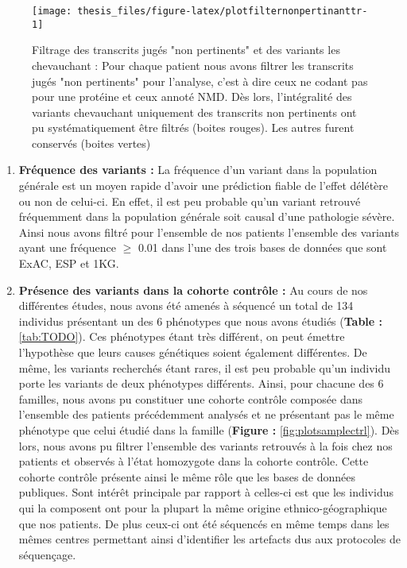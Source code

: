 \documentclass[12pt,twoside]{reedthesis}
\theoremstyle{definition}
\theoremstyle{definition}
\theoremstyle{remark}
\begin{document}
  \begin{figure}
  
  {\centering \texttt{[image: thesis\_files/figure-latex/plotfilternonpertinanttr-1]} 
  
  }
  
  \caption[Filtrage des transcrits jugés "non pertinents" et des variants les chevauchant]{Filtrage des transcrits jugés "non pertinents" et des variants les chevauchant : Pour chaque patient nous avons filtrer les transcrits jugés "non pertinents" pour l'analyse, c'est à dire ceux ne codant pas pour une protéine et ceux annoté NMD. Dès lors, l'intégralité des variants chevauchant uniquement des transcrits non pertinents ont pu systématiquement être filtrés (boites rouges). Les autres furent conservés (boites vertes)}\label{fig:plotfilternonpertinanttr}
  \end{figure}
  
  \begin{enumerate}
  \def\labelenumi{\arabic{enumi}.}
  \setcounter{enumi}{4}
  \item
    \textbf{Fréquence des variants :} La fréquence d'un variant dans la
    population générale est un moyen rapide d'avoir une prédiction fiable
    de l'effet délétère ou non de celui-ci. En effet, il est peu probable
    qu'un variant retrouvé fréquemment dans la population générale soit
    causal d'une pathologie sévère. Ainsi nous avons filtré pour
    l'ensemble de nos patients l'ensemble des variants ayant une fréquence
    \(\ge\) 0.01 dans l'une des trois bases de données que sont ExAC, ESP
    et 1KG.
  \item
    \textbf{Présence des variants dans la cohorte contrôle :} Au cours de
    nos différentes études, nous avons été amenés à séquencé un total de
    134 individus présentant un des 6 phénotypes que nous avons étudiés
    (\textbf{Table : }\ref{tab:TODO}). Ces phénotypes étant très
    différent, on peut émettre l'hypothèse que leurs causes génétiques
    soient également différentes. De même, les variants recherchés étant
    rares, il est peu probable qu'un individu porte les variants de deux
    phénotypes différents. Ainsi, pour chacune des 6 familles, nous avons
    pu constituer une cohorte contrôle composée dans l'ensemble des
    patients précédemment analysés et ne présentant pas le même phénotype
    que celui étudié dans la famille (\textbf{Figure :}
    \ref{fig:plotsamplectrl}). Dès lors, nous avons pu filtrer l'ensemble
    des variants retrouvés à la fois chez nos patients et observés à
    l'état homozygote dans la cohorte contrôle. Cette cohorte contrôle
    présente ainsi le même rôle que les bases de données publiques. Sont
    intérêt principale par rapport à celles-ci est que les individus qui
    la composent ont pour la plupart la même origine ethnico-géographique
    que nos patients. De plus ceux-ci ont été séquencés en même temps dans
    les mêmes centres permettant ainsi d'identifier les artefacts dus aux
    protocoles de séquençage.
  \end{enumerate}
  
\end{document}
